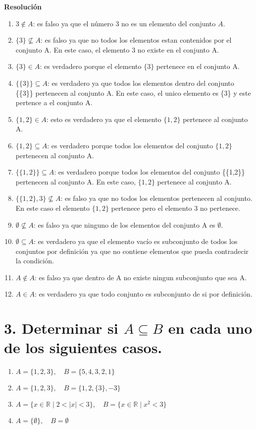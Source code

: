 \documentclass{article}
\begin{document}
\textbf{Resolución}
\begin{enumerate}[label=\roman*)]
    \item $3 \notin A$: es falso ya que el número $3$ no es un elemento del conjunto $A$.
    \item $\{3\} \not\subseteq A$: es falso ya que no todos los elementos estan contenidos por el conjunto A. En este caso, el elemento 3 no existe en el conjunto A.
    \item $\{3\} \in A$: es verdadero porque el elemento $\{3\}$ pertenece en el conjunto A.
    \item $\{\{3\}\} \subseteq A$: es verdadero ya que todos los elementos dentro del conjunto \{\{3\}\} pertenecen al conjunto A. En este caso, el unico elemento es \{3\} y este pertence a el conjunto A. 
    \item $\{1,2\} \in A$: esto es verdadero ya que el elemento $\{1,2\}$ pertenece al conjunto A.
    \item $\{1,2\} \subseteq A$: es verdadero porque todos los elementos del conjunto $\{1,2\}$ pertenecen al conjunto A. 
    \item $\{\{1,2\}\} \subseteq A$: es verdadero porque todos los elementos del conjunto \{\{1,2\}\} pertenecen al conjunto A. En este caso, $\{1,2\}$ pertenece al conjunto A. 
    \item $\{\{1,2\},3\} \not\subseteq A$: es falso ya que no todos los elementos pertenecen al conjunto. En este caso el elemento $\{1,2\}$ pertenece pero el elemento 3 no pertenece.
    \item $\emptyset \not\subseteq A$: es falso ya que ninguno de los elementos del conjunto A es $\emptyset$.
    \item $\emptyset \subseteq A$: es verdadero ya que el elemento vacío es subconjunto de todos los conjuntos por definición ya que no contiene elementos que pueda contradecir la condición.
    \item $A \not\in A$: es falso ya que dentro de A no existe ningun subconjunto que sea A.
    \item $A \in A$: es verdadero ya que todo conjunto es subconjunto de si por definición.
\end{enumerate}

\section*{3. Determinar si $A \subseteq B$ en cada uno de los siguientes casos.}

\begin{enumerate}[label=\roman*)]
    \item $A = \{1,2,3\}, \quad B = \{5,4,3,2,1\}$
    \item $A = \{1,2,3\}, \quad B = \{1,2,\{3\},-3\}$
    \item $A = \{x \in \mathbb{R} \mid 2 < |x| < 3\}, \quad B = \{x \in \mathbb{R} \mid x^2 < 3\}$
    \item $A = \{\emptyset\}, \quad B = \emptyset$
\end{enumerate}
\end{document}
